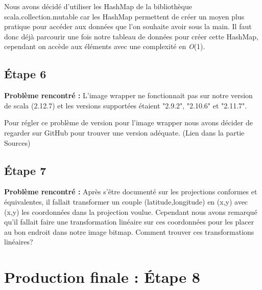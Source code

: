 \documentclass{article}
\begin{document}
\vspace{1\baselineskip}

 \newline
Nous avons décidé d'utiliser les HashMap de la bibliothèque scala.collection.mutable car les HashMap permettent de créer un moyen plus pratique pour accéder aux données que l'on souhaite avoir sous la main. Il faut donc déjà parcourir une fois notre tableau de données pour créer cette HashMap, cependant on accède aux éléments avec une complexité en \textit{O}(1).

\vspace{1\baselineskip}
\color{orange}
\subsection{Étape 6} 
\color{color2}

\textbf{Problème rencontré :} \newline
L'image wrapper ne fonctionnait pas sur notre version de scala (2.12.7) et les versions supportées étaient "2.9.2", "2.10.6" et "2.11.7".

\vspace{1\baselineskip}

 \newline
Pour régler ce problème de version pour l'image wrapper nous avons décider de regarder sur GitHub pour trouver une version adéquate. (Lien dans la partie Sources)

\color{orange}
\subsection{Étape 7}
\color{color2}

\textbf{Problème rencontré :} \newline
Après s'être documenté sur les projections conformes et équivalentes, il fallait transformer un couple (latitude,longitude) en (x,y) avec (x,y) les coordonnées dans la projection voulue. Cependant nous avons remarqué qu'il fallait faire une transformation linéaire sur ces coordonnées pour les placer au bon endroit dans notre image bitmap. Comment trouver ces transformations linéaires?

\vspace{1\baselineskip}




\color{orange} \section{ Production finale : Étape 8}
\color{color2}
\end{document}
